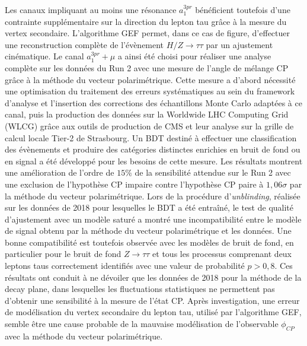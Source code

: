 Les canaux impliquant au moins une résonance $a_1^{3pr}$ bénéficient toutefois d'une contrainte supplémentaire sur la direction du lepton tau grâce à la mesure du vertex secondaire. L'algorithme GEF \cite{GEF} permet, dans ce cas de figure, d'effectuer une reconstruction complète de l'évènement $H/Z\to\tau\tau$ par un ajustement cinématique. Le canal $a_1^{3pr}+\mu$ a ainsi été choisi pour réaliser une analyse complète sur les données du Run 2 avec une mesure de l'angle de mélange CP grâce à la méthode du vecteur polarimétrique. Cette mesure a d'abord nécessité une optimisation du traitement des erreurs systématiques au sein du framework d'analyse et l'insertion des corrections des échantillons Monte Carlo adaptées à ce canal, puis la production des données sur la Worldwide LHC Computing Grid (WLCG) grâce aux outils de production de CMS et leur analyse sur la grille de calcul locale Tier-2 de Strasbourg. Un BDT destiné à effectuer une classification des évènements et produire des catégories distinctes enrichies en bruit de fond ou en signal a été développé pour les besoins de cette mesure. Les résultats montrent une amélioration de l'ordre de $15\%$ de la sensibilité attendue sur le Run 2 avec une exclusion de l'hypothèse CP impaire contre l'hypothèse CP paire à $1,06\sigma$ par la méthode du vecteur polarimétrique. Lors de la procédure d'\textit{unblinding}, réalisée sur les données de 2018 pour lesquelles le BDT a été entraîné, le test de qualité d'ajustement avec un modèle saturé a montré une incompatibilité entre le modèle de signal obtenu par la méthode du vecteur polarimétrique et les données. Une bonne compatibilité est toutefois observée avec les modèles de bruit de fond, en particulier pour le bruit de fond $Z\to\tau\tau$ et tous les processus comprenant deux leptons taus correctement identifiés avec une valeur de probabilité $p>0,8$. Ces résultats ont conduit à ne dévoiler que les données de 2018 pour la méthode de la decay plane, dans lesquelles les fluctuations statistiques ne permettent pas d'obtenir une sensibilité à la mesure de l'état CP. Après investigation, une erreur de modélisation du vertex secondaire du lepton tau, utilisé par l'algorithme GEF, semble être une cause probable de la mauvaise modélisation de l'observable $\phi_{CP}$ avec la méthode du vecteur polarimétrique. \\

